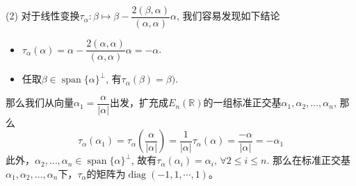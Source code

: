 (2) 对于线性变换$\tau_{\alpha}: \beta \mapsto \beta - \dfrac{2(\beta, \alpha)}{(\alpha, \alpha)} \alpha$, 我们容易发现如下结论
\begin{itemize}
\item $\tau_{\alpha}(\alpha) = \alpha - \dfrac{2(\alpha, \alpha)}{(\alpha, \alpha)} \alpha = -\alpha$.
\item 任取$\beta \in \operatorname{span}\{\alpha\}^{\perp}$, 有$\tau_{\alpha}(\beta) = \beta)$.
\end{itemize}
那么我们从向量$\alpha_1 = \dfrac{\alpha}{\lvert \alpha \rvert}$出发，扩充成$E_n(\mathbb{R})$的一组标准正交基$\alpha_1, \alpha_2, \ldots, \alpha_n$, 那么
$$\tau_{\alpha}(\alpha_1) = \tau_{\alpha}(\dfrac{\alpha}{\lvert \alpha \rvert}) = \dfrac{1}{\lvert \alpha \rvert} \tau_{\alpha}(\alpha) = \dfrac{-\alpha}{\lvert \alpha \rvert} = -\alpha_1$$
此外，$\alpha_2, \ldots, \alpha_n \in \operatorname{span}\{\alpha\}^{\perp}$, 故有$\tau_{\alpha}(\alpha_i) = \alpha_i$, $\forall 2 \leqslant i \leqslant n$. 那么在标准正交基$\alpha_1, \alpha_2, \ldots, \alpha_n$下，$\tau_{\alpha}$的矩阵为$\operatorname{diag}(-1, 1, \cdots, 1)$。


